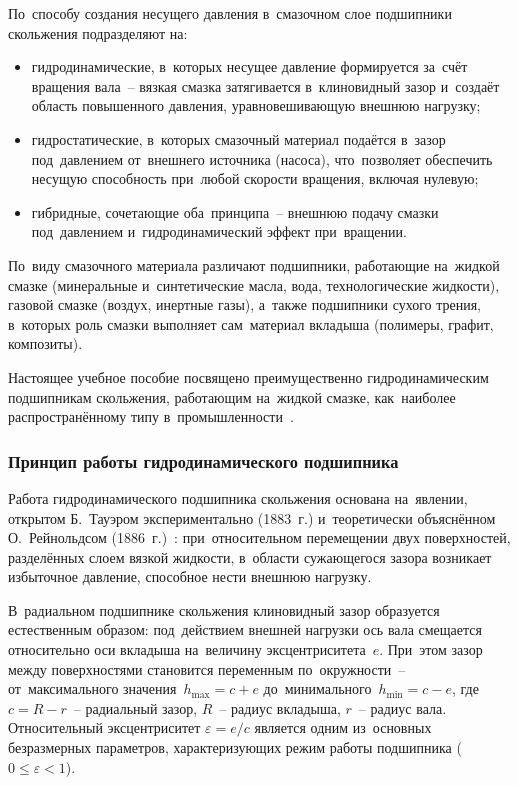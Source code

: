 По~способу создания несущего давления в~смазочном слое подшипники скольжения подразделяют на:
\begin{itemize}
\item гидродинамические, в~которых несущее давление формируется за~счёт вращения вала~-- вязкая смазка затягивается в~клиновидный зазор и~создаёт область повышенного давления, уравновешивающую внешнюю нагрузку;
\item гидростатические, в~которых смазочный материал подаётся в~зазор под~давлением от~внешнего источника (насоса), что~позволяет обеспечить несущую способность при~любой скорости вращения, включая нулевую;
\item гибридные, сочетающие оба~принципа~-- внешнюю подачу смазки под~давлением и~гидродинамический эффект при~вращении.
\end{itemize}

По~виду смазочного материала различают подшипники, работающие на~жидкой смазке (минеральные и~синтетические масла, вода, технологические жидкости), газовой смазке (воздух, инертные газы), а~также подшипники сухого трения, в~которых роль смазки выполняет сам~материал вкладыша (полимеры, графит, композиты).

Настоящее учебное пособие посвящено преимущественно гидродинамическим подшипникам скольжения, работающим на~жидкой смазке, как~наиболее распространённому типу в~промышленности~\cite{hori2002,szeri1998}.

\subsubsection{Принцип работы гидродинамического подшипника}

Работа гидродинамического подшипника скольжения основана на~явлении, открытом Б.~Тауэром экспериментально (1883~г.) и~теоретически объяснённом О.~Рейнольдсом (1886~г.)~\cite{hori2002,szeri1998}: при~относительном перемещении двух поверхностей, разделённых слоем вязкой жидкости, в~области сужающегося зазора возникает избыточное давление, способное нести внешнюю нагрузку.

В~радиальном подшипнике скольжения клиновидный зазор образуется естественным образом: под~действием внешней нагрузки ось вала смещается относительно оси вкладыша на~величину эксцентриситета~$e$. При~этом зазор между поверхностями становится переменным по~окружности~-- от~максимального значения~$h_{\max} = c + e$ до~минимального~$h_{\min} = c - e$, где~$c = R - r$~-- радиальный зазор, $R$~-- радиус вкладыша, $r$~-- радиус вала. Относительный эксцентриситет $\varepsilon = e / c$ является одним из~основных безразмерных параметров, характеризующих режим работы подшипника ($0 \leq \varepsilon < 1$).

